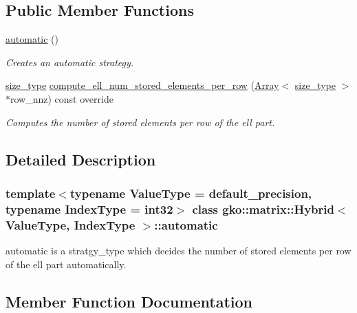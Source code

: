 \subsection*{Public Member Functions}
\begin{DoxyCompactItemize}
\item 
\mbox{\label{classgko_1_1matrix_1_1Hybrid_1_1automatic_aadf787a2d56fe0e67c4108f14ee0cb6e}} 
\hyperlink{classgko_1_1matrix_1_1Hybrid_1_1automatic_aadf787a2d56fe0e67c4108f14ee0cb6e}{automatic} ()
\begin{DoxyCompactList}\small\item\em Creates an automatic strategy. \end{DoxyCompactList}\item 
\hyperlink{namespacegko_a6e5c95df0ae4e47aab2f604a22d98ee7}{size\+\_\+type} \hyperlink{classgko_1_1matrix_1_1Hybrid_1_1automatic_a804d556fbcbe8ed754e167f270b16118}{compute\+\_\+ell\+\_\+num\+\_\+stored\+\_\+elements\+\_\+per\+\_\+row} (\hyperlink{classgko_1_1Array}{Array}$<$ \hyperlink{namespacegko_a6e5c95df0ae4e47aab2f604a22d98ee7}{size\+\_\+type} $>$ $\ast$row\+\_\+nnz) const override
\begin{DoxyCompactList}\small\item\em Computes the number of stored elements per row of the ell part. \end{DoxyCompactList}\end{DoxyCompactItemize}


\subsection{Detailed Description}
\subsubsection*{template$<$typename Value\+Type = default\+\_\+precision, typename Index\+Type = int32$>$\newline
class gko\+::matrix\+::\+Hybrid$<$ Value\+Type, Index\+Type $>$\+::automatic}

automatic is a stratgy\+\_\+type which decides the number of stored elements per row of the ell part automatically. 

\subsection{Member Function Documentation}
\mbox{\label{classgko_1_1matrix_1_1Hybrid_1_1automatic_a804d556fbcbe8ed754e167f270b16118}} 
